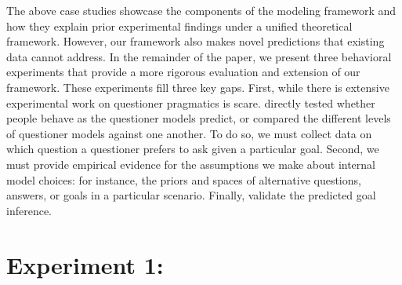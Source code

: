 \documentclass[12pt, floatsintext, jou]{apa6}
\begin{document}
The above case studies showcase the components of the modeling framework and how they explain prior experimental findings under a unified theoretical framework. 
However, our framework also makes novel predictions that existing data cannot address.
In the remainder of the paper, we present three behavioral experiments that provide a more rigorous evaluation and extension of our framework.
These experiments fill three key gaps.
First, while there is extensive experimental work on questioner pragmatics is scare.
 directly tested whether people behave as the questioner models predict, or compared the different levels of questioner models against one another. 
To do so, we must collect data on which question a questioner prefers to ask given a particular goal. 
Second, we must provide empirical evidence for the assumptions we make about internal model choices: for instance, the priors and spaces of alternative questions, answers, or goals in a particular scenario. 
Finally, validate the predicted goal inference. 


\section{Experiment 1: \\ }
\end{document}

